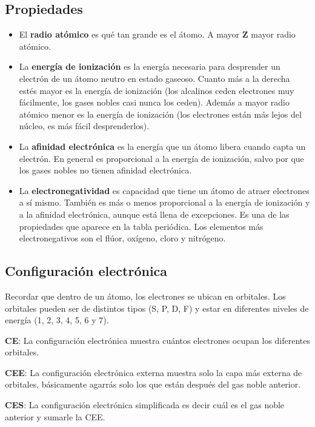 \subsection*{Propiedades}
\begin{itemize}
    \item El \textbf{radio atómico} es qué tan grande es el átomo. A mayor \textbf{Z} mayor radio atómico.
    \item La \textbf{energía de ionización} es la energía necesaria para desprender un electrón de un átomo neutro en estado gaseoso. Cuanto más a la derecha estés mayor es la energía de ionización (los alcalinos ceden electrones muy fácilmente, los gases nobles casi nunca los ceden). Además a mayor radio atómico menor es la energía de ionización (los electrones están más lejos del núcleo, es más fácil desprenderlos).
    \item La \textbf{afinidad electrónica} es la energía que un átomo libera cuando capta un electrón. En general es proporcional a la energía de ionización, salvo por que los gases nobles no tienen afinidad electrónica.
    \item La \textbf{electronegatividad} es capacidad que tiene un átomo de atraer electrones a sí mismo. También es más o menos proporcional a la energía de ionización y a la afinidad electrónica, aunque está llena de excepciones. Es una de las propiedades que aparece en la tabla periódica. Los elementos más electronegativos son el flúor, oxígeno, cloro y nitrógeno.
\end{itemize}


\subsection*{Configuración electrónica}

Recordar que dentro de un átomo, los electrones se ubican en orbitales. Los orbitales pueden ser de distintos tipos (S, P, D, F) y estar en diferentes niveles de energía (1, 2, 3, 4, 5, 6 y 7).

\sskip
\textbf{CE}: La configuración electrónica muestra cuántos electrones ocupan los diferentes orbitales.

\textbf{CEE}: La configuración electrónica externa muestra solo la capa más externa de orbitales, básicamente agarrás solo los que están después del gas noble anterior.

\textbf{CES}: La configuración electrónica simplificada es decir cuál es el gas noble anterior y sumarle la CEE.

